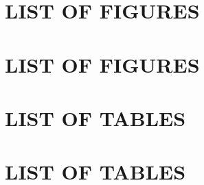 \documentclass[
  letterpaper,
  11pt,
  english,
  doublespacing,
  headsepline,
  consistentlayout,
  oneside,
  openany]{MastersDoctoralThesis}
\renewcommand*\contentsname{Table of contents}
\newcommand\contentsname{Table of contents}
\renewcommand*\listfigurename{List of Figures}
\newcommand\listfigurename{List of Figures}
\renewcommand*\listtablename{List of Tables}
\newcommand\listtablename{List of Tables}
\begin{document}

	\renewcommand{\chapteralign}{\centering}
	\renewcommand{\chapterfont}{\bfseries\Large}

\renewcommand{\listfigurename}{LIST OF FIGURES}
\patchcmd{\listoffigures}
  {\chapter*{\listfigurename}}
  {\chapter*{\bfseries\Large \listfigurename}}
  {}{}
	\listoffigures
\renewcommand{\listtablename}{LIST OF TABLES}
\patchcmd{\listoftables}
  {\chapter*{\listtablename}}
  {\chapter*{\bfseries\Large \listtablename}}
  {}{}
\listoftables
%
%
%

\endgroup


\begingroup
\renewcommand{\chapteralign}{\centering}

\endgroup
\end{document}
